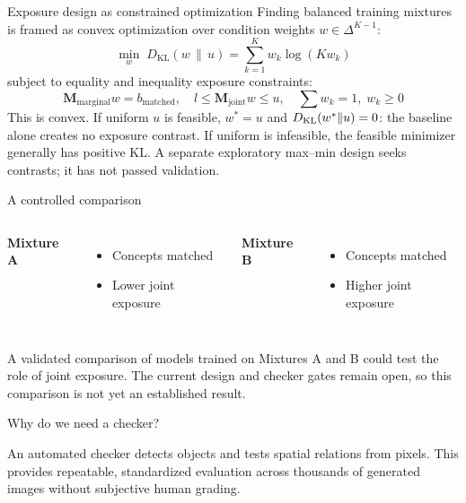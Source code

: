 \documentclass[aspectratio=169,11pt]{beamer}
\begin{document}
\begin{frame}{Exposure design as constrained optimization}
\normalsize Finding balanced training mixtures is framed as convex optimization over condition weights $w \in \Delta^{K-1}$:
\[\min_{w} \; D_{\text{KL}}(w \,\|\, u) = \sum_{k=1}^K w_k \log(K w_k)\]
\vspace{-2mm}
subject to equality and inequality exposure constraints:
\[\mathbf{M}_{\text{marginal}} w = b_{\text{matched}}, \quad l \le \mathbf{M}_{\text{joint}} w \le u, \quad \sum w_k = 1, \; w_k \ge 0\]
\small This is convex. If uniform $u$ is feasible, $w^*=u$ and $D_{\rm KL}(w^*\Vert u)=0$: the baseline alone creates no exposure contrast. If uniform is infeasible, the feasible minimizer generally has positive KL. A separate exploratory max--min design seeks contrasts; it has not passed validation.
\end{frame}

\begin{frame}{A controlled comparison}
\begin{columns}[T]
\textbf{Mixture A}\begin{itemize}\item Concepts matched\item Lower joint exposure\end{itemize}
\textbf{Mixture B}\begin{itemize}\item Concepts matched\item Higher joint exposure\end{itemize}
\end{columns}
\vspace{4mm}
\normalsize A validated comparison of models trained on Mixtures A and B could test the role of joint exposure. The current design and checker gates remain open, so this comparison is not yet an established result.
\end{frame}

\begin{frame}{Why do we need a checker?}
\begin{center}\end{center}
\vspace{2mm}
\normalsize An automated checker detects objects and tests spatial relations from pixels. This provides repeatable, standardized evaluation across thousands of generated images without subjective human grading.
\end{frame}
\end{document}
